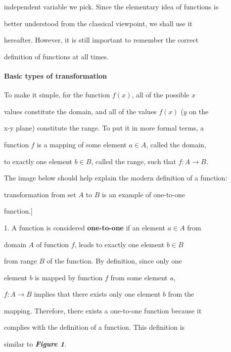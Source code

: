 independent variable we pick. Since the elementary idea of functions is

better understood from the classical viewpoint, we shall use it

hereafter. However, it is still important to remember the correct

definition of functions at all times.



\paragraph{Basic types of transformation}



To make it simple, for the function $f(x)$, all of the possible $x$

values constitute the domain, and all of the values $f(x)$ ($y$ on the

x-y plane) constitute the range. To put it in more formal terms, a

function $f$ is a mapping of some element $a\in A$, called the domain,

to exactly one element $b\in B$, called the range, such that $f:A\to B$.

The image below should help explain the modern definition of a function:




transformation from set $A$ to $B$ is an example of one-to-one

function.]



1.  A function is considered \textbf{one-to-one} if an element $a\in A$ from

    domain $A$ of function $f$, leads to exactly one element $b\in B$

    from range $B$ of the function. By definition, since only one

    element $b$ is mapped by function $f$ from some element $a$,

    $f:A\to B$ implies that there exists only one element $b$ from the

    mapping. Therefore, there exists a one-to-one function because it

    complies with the definition of a function. This definition is

    similar to \textbf{\textit{Figure 1}}.

